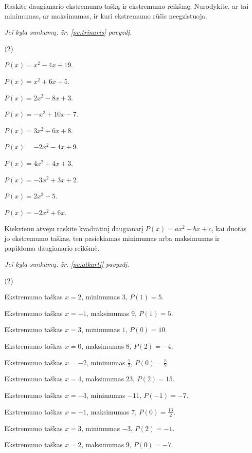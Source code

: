 \documentclass[11pt,a4paper]{scrartcl}
\makeatletter
\numberwithin{exercise}{section}
\renewenvironment{exercise}{\@thm{\th@definition}{exercise}{}}{\@endtheorem}
\newcommand{\pagalba}[1]{{\small\itshape Jei kyla sunkumų, žr. \ref{#1} pavyzdį.}}
\makeatother
\begin{document}
\begin{exercise}\label{uz:trinaris}

Raskite daugianario ekstremumo tašką ir ekstremumo reikšmę. Nurodykite, ar tai minimumas, ar maksimumas, ir kuri ekstremumo rūšis neegzistuoja.

\par\pagalba{pv:trinaris}

\begin{tasks}[label=(\arabic*),label-width=2em](2)

\task $P(x)=x^2-4x+19$.

\task $P(x)=x^2+6x+5$.

\task $P(x)=2x^2-8x+3$.

\task $P(x)=-x^2+10x-7$.

\task $P(x)=3x^2+6x+8$.

\task $P(x)=-2x^2-4x+9$.

\task $P(x)=4x^2+4x+3$.

\task $P(x)=-3x^2+3x+2$.

\task $P(x)=2x^2-5$.

\task $P(x)=-2x^2+6x$.

\end{tasks}

\end{exercise}

\newpage

\begin{exercise}\label{uz:atkurti}

Kiekvienu atveju raskite kvadratinį daugianarį $P(x)=ax^2+bx+c$, kai duotas jo ekstremumo taškas, ten pasiekiamas minimumas arba maksimumas ir papildoma daugianario reikšmė.

\par\pagalba{pv:atkurti}

\begin{tasks}[label=(\arabic*), label-width=1.8em](2)

\task Ekstremumo taškas $x=2$, minimumas $3$, $P(1)=5$.

\task Ekstremumo taškas $x=-1$, maksimumas $9$, $P(1)=5$.

\task Ekstremumo taškas $x=3$, minimumas $1$, $P(0)=10$.

\task Ekstremumo taškas $x=0$, maksimumas $8$, $P(2)=-4$.

\task Ekstremumo taškas $x=-2$, minimumas $\frac{1}{2}$, $P(0)=\frac{5}{2}$.

\task Ekstremumo taškas $x=4$, maksimumas $23$, $P(2)=15$.

\task Ekstremumo taškas $x=-3$, minimumas $-11$, $P(-1)=-7$.

\task Ekstremumo taškas $x=-1$, maksimumas $7$, $P(0)=\frac{13}{2}$.

\task Ekstremumo taškas $x=3$, minimumas $-3$, $P(2)=-1$.

\task Ekstremumo taškas $x=2$, maksimumas $9$, $P(0)=-7$.

\end{tasks}

\end{exercise}
\end{document}
